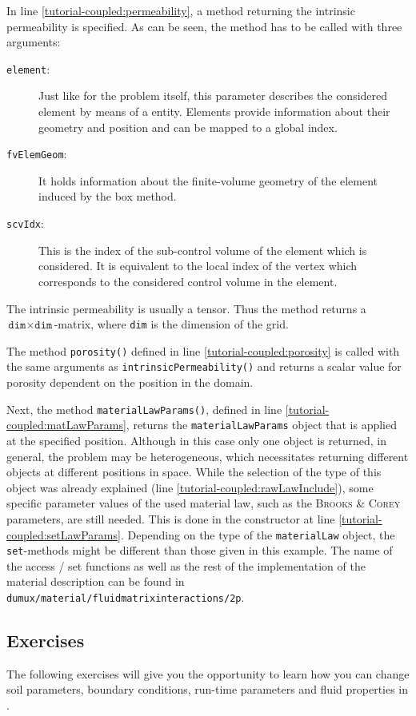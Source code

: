 In line \ref{tutorial-coupled:permeability}, a method returning the
intrinsic permeability is specified. As can be seen, the method has
to be called with three arguments:
\begin{description}
\item[\texttt{element}:] Just like for the problem itself, this
  parameter describes the considered element by means of a \Dune
  entity. Elements provide information about their geometry and
  position and can be mapped to a global index.
\item[\texttt{fvElemGeom}:] It holds information about the finite-volume
  geometry of the element induced by the box method.
\item[\texttt{scvIdx}:] This is the index of the sub-control volume of the
  element which is considered. It is equivalent to the local index
  of the vertex which corresponds to the considered control volume in
  the element.
\end{description}

The intrinsic permeability is usually a tensor. Thus the method returns
a $\texttt{dim} \times \texttt{dim}$-matrix, where \texttt{dim} is the
dimension of the grid.

The method \texttt{porosity()} defined in line
\ref{tutorial-coupled:porosity} is called with the same arguments as
\texttt{intrinsicPermeability()} and returns a scalar value for
porosity dependent on the position in the domain.

Next, the method \texttt{materialLawParams()}, defined in line
\ref{tutorial-coupled:matLawParams}, returns the
\verb+materialLawParams+ object that is applied at the specified
position. Although in this case only one object is returned, in
general, the problem may be heterogeneous, which necessitates
returning different objects at different positions in space.  While
the selection of the type of this object was already explained (line
\ref{tutorial-coupled:rawLawInclude}), some specific parameter values
of the used material law, such as the \textsc{Brooks} \&
\textsc{Corey} parameters, are still needed. This is done in the
constructor at line \ref{tutorial-coupled:setLawParams}.  Depending on
the type of the \texttt{materialLaw} object, the \texttt{set}-methods
might be different than those given in this example. The name of the
access / set functions as well as the rest of the implementation of
the material description can be found in
\verb+dumux/material/fluidmatrixinteractions/2p+.

\subsection{Exercises}
\label{tutorial-coupled:exercises}
The following exercises will give you the opportunity to learn how you
can change soil parameters, boundary conditions, run-time parameters
and fluid properties in \Dumux.


